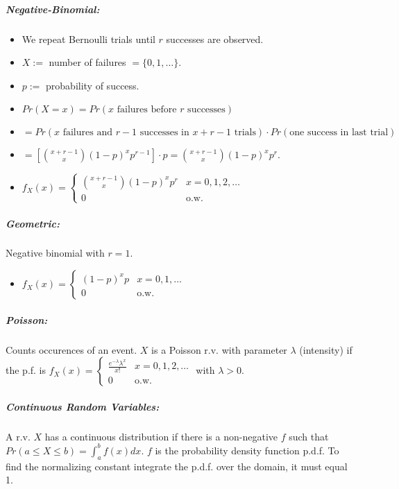 \documentclass[landscape,10pt]{article}
\begin{document}
\begin{multicols}{3}
    \subparagraph*{Negative-Binomial: }
        \begin{itemize}
            \item[] We repeat Bernoulli trials until $r$ successes are observed. 
            \item[] $X :=$ number of failures $= \{0, 1, \ldots\}$. 
            \item[] $p :=$ probability of success. 
            \item[] $Pr(X = x) = Pr(x \text{ failures before $r$ successes}) $
            \item[] $ = Pr(x \text{ failures and $r-1$ successes in $x + r - 1$ trials}) \cdot Pr(\text{one success in last trial}) $
            \item[] $= \left[{x+r-1 \choose x } (1-p)^x p^{r-1} \right] \cdot p = {x + r - 1 \choose x} (1 - p)^x p^r$. 
            \item[] $f_X(x) =
    \begin{cases}
    {x+r-1 \choose x} (1-p)^x p^r   &   x=0,1,2,\ldots \\
    0       & \text{o.w.}
    \end{cases}$
\end{itemize}

    \subparagraph*{Geometric: }
        Negative binomial with $r=1.$
        \begin{itemize}
            \item[] $f_X(x) = \begin{cases} (1-p)^x p & x=0,1,\ldots \\ 0 & \text{o.w.} \end{cases}$
        \end{itemize}

    \subparagraph*{Poisson: }
        Counts occurences of an event. $X$ is a Poisson r.v. with parameter $\lambda$ (intensity) if the p.f. is $f_X(x) = \begin{cases} \frac{e^{-\lambda}\lambda^x}{x!} & x=0,1,2,\ldots \\ 0 & \text{o.w.} \end{cases}$ with $\lambda>0$.

    \subparagraph*{Continuous Random Variables: }
        A r.v. $X$ has a continuous distribution if there is a non-negative $f$ such that $Pr(a \leq X \leq b) = \int_{a}^{b} f(x)dx$. $f$ is the probability density function p.d.f. To find the normalizing constant integrate the p.d.f. over the domain, it must equal 1.


\end{multicols}
\end{document}
